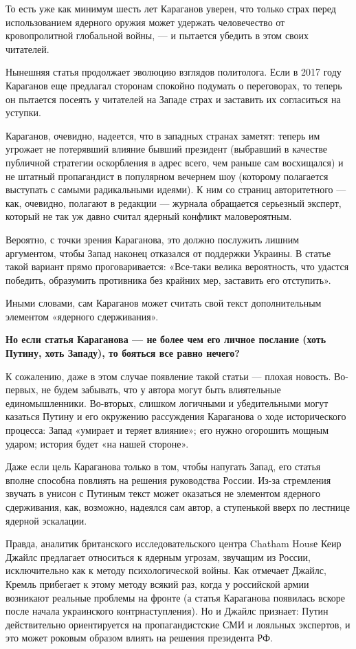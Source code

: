 То есть уже как минимум шесть лет Караганов уверен, что только страх перед использованием ядерного оружия может удержать человечество от кровопролитной глобальной войны, — и пытается убедить в этом своих читателей.

Нынешняя статья продолжает эволюцию взглядов политолога. Если в 2017 году Караганов еще предлагал сторонам спокойно подумать о переговорах, то теперь он пытается посеять у читателей на Западе страх и заставить их согласиться на уступки.

Караганов, очевидно, надеется, что в западных странах заметят: теперь им угрожает не потерявший влияние бывший президент (выбравший в качестве публичной стратегии оскорбления в адрес всего, чем раньше сам восхищался) и не штатный пропагандист в популярном вечернем шоу (которому полагается выступать с самыми радикальными идеями). К ним со страниц авторитетного — как, очевидно, полагают в редакции — журнала обращается серьезный эксперт, который не так уж давно считал ядерный конфликт маловероятным.

Вероятно, с точки зрения Караганова, это должно послужить лишним аргументом, чтобы Запад наконец отказался от поддержки Украины. В статье такой вариант прямо проговаривается: «Все-таки велика вероятность, что удастся победить, образумить противника без крайних мер, заставить его отступить».

Иными словами, сам Караганов может считать свой текст дополнительным элементом «ядерного сдерживания».

\textbf{Но если статья Караганова — не более чем его личное послание (хоть Путину, хоть Западу), то бояться все равно нечего?}

К сожалению, даже в этом случае появление такой статьи — плохая новость. Во-первых, не будем забывать, что у автора могут быть влиятельные единомышленники. Во-вторых, слишком логичными и убедительными могут казаться Путину и его окружению рассуждения Караганова о ходе исторического процесса: Запад «умирает и теряет влияние»; его нужно огорошить мощным ударом; история будет «на нашей стороне».

Даже если цель Караганова только в том, чтобы напугать Запад, его статья вполне способна повлиять на решения руководства России. Из-за стремления звучать в унисон с Путиным текст может оказаться не элементом ядерного сдерживания, как, возможно, надеялся сам автор, а ступенькой вверх по лестнице ядерной эскалации.

Правда, аналитик британского исследовательского центра Chatham Housе Кеир Джайлс предлагает относиться к ядерным угрозам, звучащим из России, исключительно как к методу психологической войны. Как отмечает Джайлс, Кремль прибегает к этому методу всякий раз, когда у российской армии возникают реальные проблемы на фронте (а статья Караганова появилась вскоре после начала украинского контрнаступления). Но и Джайлс признает: Путин действительно ориентируется на пропагандистские СМИ и лояльных экспертов, и это может роковым образом влиять на решения президента РФ.

